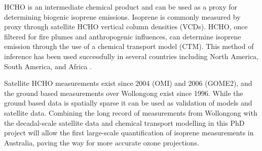 HCHO is an intermediate chemical product and can be used as a proxy for determining biogenic isoprene emissions. 
Isoprene is commonly measured by proxy through satellite HCHO vertical column densities (VCDs). HCHO, once filtered for fire plumes and anthropogenic influences, can determine isoprene emission through the use of a chemical transport model (CTM).
This method of inference has been used successfully in several countries including North America\cite{Palmer_2003}, South America\cite{Barkley_2013}, and Africa \cite{Marais_2012}.

Satellite HCHO measurements exist since 2004 (OMI) and 2006 (GOME2), and the ground based measurements over Wollongong exist since 1996. While the ground based data is spatially sparse it can be used as validation of models and satellite data. Combining the long record of measurements from Wollongong with the decadal-scale satellite data and chemical transport modelling in this PhD project will allow the first large-scale quantification of isoprene measurements in Australia, paving the way for more accurate ozone projections.

  